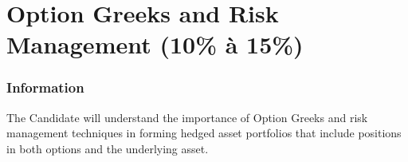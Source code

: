 \chapter[Option Greeks and Risk Management]{Option Greeks and Risk Management (10\% à 15\%)}

\subsection{Information}

\begin{distributions}[Objective]
The Candidate will understand the importance of Option Greeks and risk management techniques in forming hedged asset portfolios that include positions in both options and the underlying asset.
\end{distributions}

